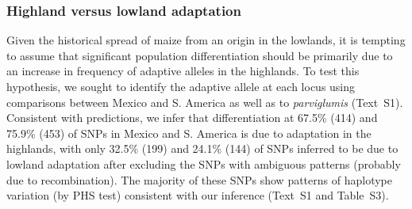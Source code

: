 {{%




\subsubsection{Highland versus lowland adaptation}  

Given the historical spread of maize from an origin in the lowlands, it is tempting to assume that significant population differentiation should be primarily due to an increase in frequency of adaptive alleles in the highlands.
To test this hypothesis, we sought to identify the adaptive allele at each locus using comparisons between Mexico and S. America as well as to \emph{parviglumis} (Text~S1).  Consistent with predictions, we infer that differentiation at 67.5\% (414) and 75.9\% (453) of SNPs in Mexico and S. America is due to adaptation in the highlands, with only 32.5\% (199) and 24.1\% (144) of SNPs inferred to be due to lowland adaptation after excluding the SNPs with ambiguous patterns (probably due to recombination). 
The majority of these SNPs show patterns of haplotype variation (by PHS test) consistent with our inference (Text~S1 and Table~S3).

}}
